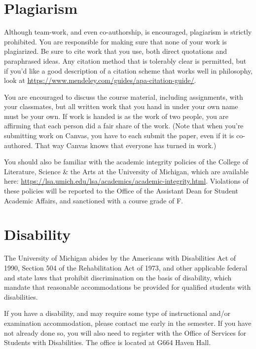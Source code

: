 \documentclass[
  12pt,
  letterpaper,
  DIV=11,
  numbers=noendperiod]{scrartcl}
\begin{document}
\section{Plagiarism}\label{plagiarism}

Although team-work, and even co-authorship, is encouraged, plagiarism is
strictly prohibited. You are responsible for making sure that none of
your work is plagiarized. Be sure to cite work that you use, both direct
quotations and paraphrased ideas. Any citation method that is tolerably
clear is permitted, but if you'd like a good description of a citation
scheme that works well in philosophy, look at
\url{https://www.mendeley.com/guides/apa-citation-guide/}.

You are encouraged to discuss the course material, including
assignments, with your classmates, but all written work that you hand in
under your own name must be your own. If work is handed is as the work
of two people, you are affirming that each person did a fair share of
the work. (Note that when you're submitting work on Canvas, you have to
each submit the paper, even if it is co-authored. That way Canvas knows
that everyone has turned in work.)

You should also be familiar with the academic integrity policies of the
College of Literature, Science \& the Arts at the University of
Michigan, which are available here:
\url{https://lsa.umich.edu/lsa/academics/academic-integrity.html}.
Violations of these policies will be reported to the Office of the
Assistant Dean for Student Academic Affairs, and sanctioned with a
course grade of F.

\section{Disability}\label{disability}

The University of Michigan abides by the Americans with Disabilities Act
of 1990, Section 504 of the Rehabilitation Act of 1973, and other
applicable federal and state laws that prohibit discrimination on the
basis of disability, which mandate that reasonable accommodations be
provided for qualified students with disabilities.

If you have a disability, and may require some type of instructional
and/or examination accommodation, please contact me early in the
semester. If you have not already done so, you will also need to
register with the Office of Services for Students with Disabilities. The
office is located at G664 Haven Hall.
\end{document}
